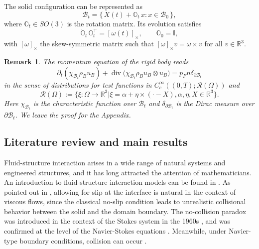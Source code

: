 \documentclass[11pt,twoside,reqno]{amsart}
\numberwithin{equation}{section}
\numberwithin{figure}{section}
\newtheorem{remark}{Remark}[section]
\begin{document}
The solid configuration can be represented as
\begin{equation}\label{eq:body-domain}
    \mathcal{B}_t = \bigl\{\, X(t) + \mathbb{O}_t\, x : x \in \mathcal{B}_0 \,\bigr\},
\end{equation}
where $\mathbb{O}_t \in SO(3)$ is the rotation matrix. Its evolution satisfies
\begin{equation}\label{eq:rotation-ode}
    \dot{\mathbb{O}}_t \,\mathbb{O}_t^{\!\top} = [\omega(t)]_\times,
    \qquad \mathbb{O}_0 = \mathbb{I},
\end{equation}
with $[\omega]_\times$ the skew-symmetric matrix such that $[\omega]_\times v = \omega \times v$ for all $v \in \mathbb{R}^3$.

\begin{remark}
     The momentum equation of the rigid body reads
    \begin{equation}\label{eq:MomentumPDED}
        \partial_t(\chi_{\mathcal{B}_t}\rho_Bu_B)+\operatorname{div}\bigl(\chi_{\mathcal{B}_t}\rho_Bu_B\otimes u_B\bigr)=p_Fn\delta_{\partial\mathcal{B}_t}
    \end{equation}
   in the sense of distributions for test functions in $C_c^\infty((0,T);\mathcal{R}(\Omega))$ and 
\begin{equation}
    \mathcal{R}(\Omega):=\{\xi:\Omega\to \mathbb{R}^3 \big| \xi=\alpha+\eta\times(\cdot-X), \alpha,\eta,X\in \mathbb{R}^3 \}.
\end{equation}
Here $\chi_{\mathcal{B}_t}$ is the characteristic function over $\mathcal{B}_t$ and $\delta_{\partial\mathcal{B}_t}$ is the Dirac measure over $\partial\mathcal{B}_t$. We leave the proof for the Appendix.
\end{remark}



\subsection{Literature review and main results} 
Fluid-structure interaction arises in a wide range of natural systems and engineered structures, and it has long attracted the attention of mathematicians. An introduction to fluid-structure interaction models can be found in \cite{MR1942470}. As pointed out in \cite{gerard2014existence}, allowing for slip at the interface is natural in the context of viscous flows, since the classical no-slip condition leads to unrealistic collisional behavior between the solid and the domain boundary. The no-collision paradox was introduced in the context of the Stokes system in the 1960s \cite{MR161549,cooley1969slow}, and was confirmed at the level of the Navier-Stokes equations \cite{MR2354496,MR2481302}. Meanwhile, under Navier-type boundary conditions, collision can occur \cite{MR2665044,MR3281946}. 
\end{document}
